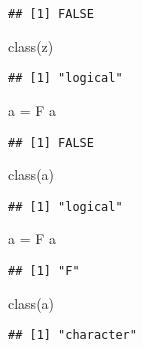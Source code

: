 \documentclass[
]{book}
\newenvironment{Shaded}{\begin{snugshade}}{\end{snugshade}}
\newcommand{\FunctionTok}[1]{\textcolor[rgb]{0.00,0.00,0.00}{#1}}
\newcommand{\NormalTok}[1]{#1}
\newcommand{\OtherTok}[1]{\textcolor[rgb]{0.56,0.35,0.01}{#1}}
\newcommand{\StringTok}[1]{\textcolor[rgb]{0.31,0.60,0.02}{#1}}
\begin{document}
\begin{verbatim}
## [1] FALSE
\end{verbatim}

\begin{Shaded}
\begin{Highlighting}[]
\FunctionTok{class}\NormalTok{(z)}
\end{Highlighting}
\end{Shaded}

\begin{verbatim}
## [1] "logical"
\end{verbatim}

\begin{Shaded}
\begin{Highlighting}[]
\NormalTok{a }\OtherTok{=}\NormalTok{ F}
\NormalTok{a}
\end{Highlighting}
\end{Shaded}

\begin{verbatim}
## [1] FALSE
\end{verbatim}

\begin{Shaded}
\begin{Highlighting}[]
\FunctionTok{class}\NormalTok{(a)}
\end{Highlighting}
\end{Shaded}

\begin{verbatim}
## [1] "logical"
\end{verbatim}

\begin{Shaded}
\begin{Highlighting}[]
\NormalTok{a }\OtherTok{=} \StringTok{\textquotesingle{}F\textquotesingle{}}
\NormalTok{a}
\end{Highlighting}
\end{Shaded}

\begin{verbatim}
## [1] "F"
\end{verbatim}

\begin{Shaded}
\begin{Highlighting}[]
\FunctionTok{class}\NormalTok{(a)}
\end{Highlighting}
\end{Shaded}

\begin{verbatim}
## [1] "character"
\end{verbatim}
\end{document}
